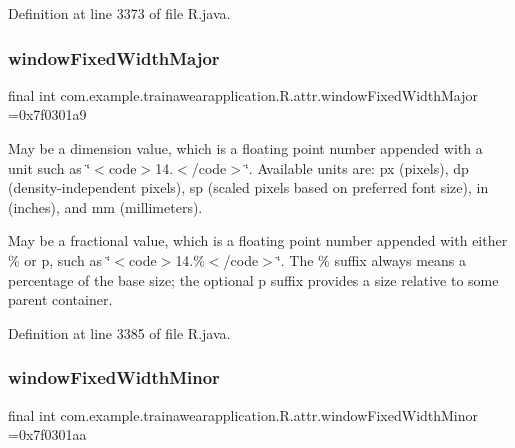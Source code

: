 Definition at line 3373 of file R.\+java.

\mbox{\label{classcom_1_1example_1_1trainawearapplication_1_1_r_1_1attr_a777f6600986b72208b0394fcd5eedc23}} 
\subsubsection{\texorpdfstring{windowFixedWidthMajor}{windowFixedWidthMajor}}
{\footnotesize\ttfamily final int com.\+example.\+trainawearapplication.\+R.\+attr.\+window\+Fixed\+Width\+Major =0x7f0301a9\hspace{0.3cm}{\ttfamily [static]}}

May be a dimension value, which is a floating point number appended with a unit such as \char`\"{}$<$code$>$14.\+5sp$<$/code$>$\char`\"{}. Available units are\+: px (pixels), dp (density-\/independent pixels), sp (scaled pixels based on preferred font size), in (inches), and mm (millimeters). 

May be a fractional value, which is a floating point number appended with either \% or p, such as \char`\"{}$<$code$>$14.\%$<$/code$>$\char`\"{}. The \% suffix always means a percentage of the base size; the optional p suffix provides a size relative to some parent container. 

Definition at line 3385 of file R.\+java.

\mbox{\label{classcom_1_1example_1_1trainawearapplication_1_1_r_1_1attr_a6c9982d085664f162825a9fe2f119c93}} 
\subsubsection{\texorpdfstring{windowFixedWidthMinor}{windowFixedWidthMinor}}
{\footnotesize\ttfamily final int com.\+example.\+trainawearapplication.\+R.\+attr.\+window\+Fixed\+Width\+Minor =0x7f0301aa\hspace{0.3cm}{\ttfamily [static]}}


